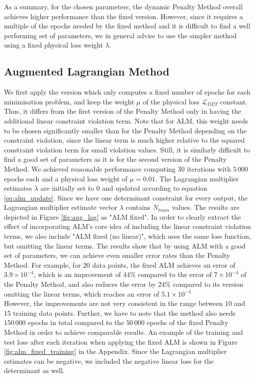 As a summary, for the chosen parameters, the dynamic Penalty Method overall achieves higher performance than the fixed version. However, since it requires a multiple of the epochs needed by the fixed method and it is difficult to find a well performing set of parameters, we in general advise to use the simpler method using a fixed physical loss weight $\lambda$.

\subsection{Augmented Lagrangian Method}

We first apply the version which only computes a fixed number of epochs for each minimisation problem, and keep the weight $\mu$ of the physical loss $\mathcal{L}_{DET}$ constant. Thus, it differs from the first version of the Penalty Method only in having the additional linear constraint violation term. Note that for ALM, this weight needs to be chosen significantly smaller than for the Penalty Method depending on the constraint violation, since the linear term is much higher relative to the squared constraint violation term for small violation values. Still, it is similarly difficult to find a good set of parameters as it is for the second version of the Penalty Method. We achieved reasonable performance computing 30 iterations with $5\,000$ epochs each and a physical loss weight of $\mu = 0.01$. The Lagrangian multiplier estimates $\lambda$ are initially set to $0$ and updated according to equation \eqref{eq:alm_update}. Since we have one determinant constraint for every output, the Lagrangian multiplier estimate vector $\lambda$ contains $N_{train}$ values. The results are depicted in Figure \ref{fig:aug_lag} as "ALM fixed". In order to clearly extract the effect of incorporating ALM's core idea of including the linear constraint violation terms, we also include "ALM fixed (no linear)", which uses the same loss function, but omitting the linear terms. The results show that by using ALM with a good set of parameters, we can achieve even smaller error rates than the Penalty Method. For example, for 20 data points, the fixed ALM achieves an error of $3.9 \times 10^{-4}$, which is an improvement of $44\%$ compared to the error of $7 \times 10^{-4}$ of the Penalty Method, and also reduces the error by $24\%$ compared to its version omitting the linear terms, which reaches an error of $5.1 \times 10^{-4} $\\
\indent However, the improvements are not very consistent in the range between 10 and 15 training data points. Further, we have to note that the method also needs $150\,000$ epochs in total compared to the $50\,000$ epochs of the fixed Penalty Method in order to achieve comparable results. An example of the training and test loss after each iteration when applying the fixed ALM is shown in Figure \ref{fig:alm_fixed_training} in the Appendix. Since the Lagrangian multiplier estimates can be negative, we included the negative linear loss for the determinant as well.
